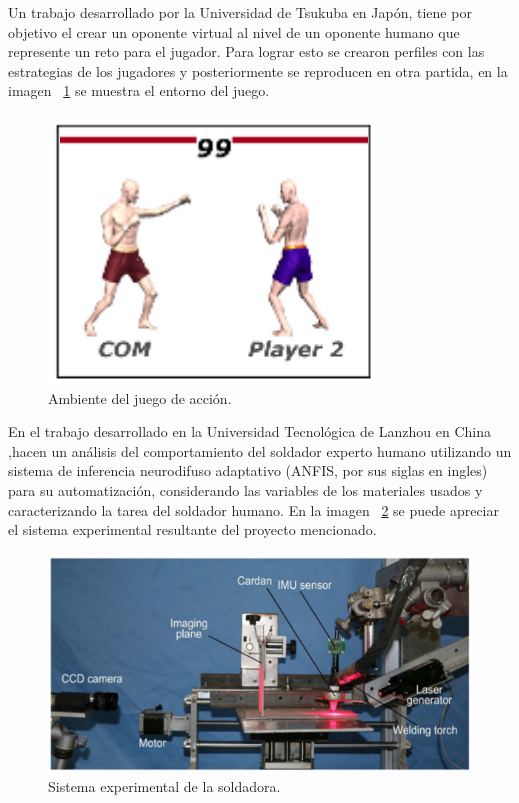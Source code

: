 Un trabajo desarrollado por la Universidad de Tsukuba en
 Japón\cite{Nakano2006}, tiene por objetivo el crear un oponente virtual
 al nivel de un oponente humano que represente un reto para el jugador. Para
 lograr esto se crearon perfiles con las estrategias de los jugadores y
 posteriormente se reproducen en otra partida, en la imagen ~\ref{fig:imitat}
 se muestra el entorno del juego.


\begin{figure}[H]
\centering
\includegraphics[width=0.5\columnwidth]{CapituloI/Imagenes/Imitating.png}
\caption{Ambiente del juego de acción.}
\label{fig:imitat}
\end{figure}


En el trabajo desarrollado en la Universidad Tecnológica de Lanzhou en China
 \cite{Zhang2017},hacen un análisis del comportamiento del soldador experto
 humano utilizando un sistema de inferencia neurodifuso adaptativo (ANFIS,
 por sus siglas en ingles) para su automatización, considerando las variables
 de los materiales usados y caracterizando la tarea del soldador humano.
 En la imagen ~\ref{fig:syswelding} se puede apreciar el sistema experimental resultante del proyecto mencionado.


\begin{figure}[H]
\centering
\includegraphics[width=0.8\columnwidth]{CapituloI/Imagenes/Welding.png}
\caption{Sistema experimental de la soldadora.}
\label{fig:syswelding}
\end{figure} 
 

